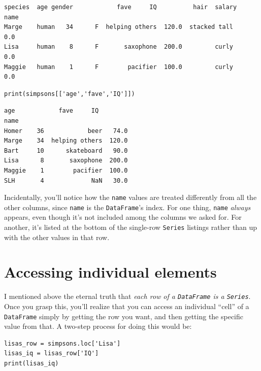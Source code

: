 \begin{Verbatim}[fontsize=\CBCodeSmall,samepage=true,frame=leftline,framesep=5mm,framerule=1mm]
       species  age gender            fave     IQ          hair  salary
name                                                                   
Marge    human   34      F  helping others  120.0  stacked tall     0.0
Lisa     human    8      F       saxophone  200.0         curly     0.0
Maggie   human    1      F        pacifier  100.0         curly     0.0
\end{Verbatim}

\medskip
\begin{Verbatim}[fontsize=\CBCodeSmall,samepage=true,frame=single,framesep=3mm]
print(simpsons[['age','fave','IQ']])
\end{Verbatim}
\vspace{-.2in}

\begin{Verbatim}[fontsize=\CBCodeSmall,samepage=true,frame=leftline,framesep=5mm,framerule=1mm]
        age            fave     IQ
name                              
Homer    36            beer   74.0
Marge    34  helping others  120.0
Bart     10      skateboard   90.0
Lisa      8       saxophone  200.0
Maggie    1        pacifier  100.0
SLH       4             NaN   30.0
\end{Verbatim}

Incidentally, you'll notice how the \texttt{name} values are treated
differently from all the other columns, since \texttt{name} is the
\texttt{DataFrame}'s index. For one thing, \texttt{name} \textit{always}
appears, even though it's not included among the columns we asked for. For
another, it's listed at the bottom of the single-row \texttt{Series} listings
rather than up with the other values in that row.

\section{Accessing individual elements}

\label{accessIndividualElementsOfDataFrame}

I mentioned above the eternal truth that \textit{each row of a
\texttt{DataFrame} is a \texttt{Series}}. Once you grasp this, you'll realize
that you can access an individual ``cell'' of a \texttt{DataFrame} simply by
getting the row you want, and then getting the specific value from that. A
two-step process for doing this would be:

\begin{Verbatim}[fontsize=\small,samepage=true,frame=single,framesep=3mm]
lisas_row = simpsons.loc['Lisa']
lisas_iq = lisas_row['IQ']
print(lisas_iq)
\end{Verbatim}
\vspace{-.2in}

